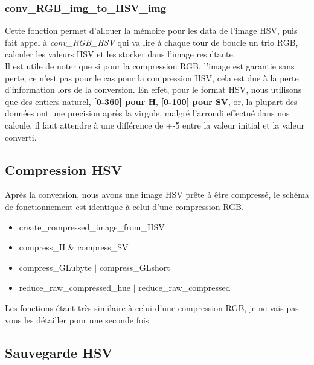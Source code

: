 \documentclass[12pt, letterpaper]{article}
\begin{document}
\subsubsection{conv\_RGB\_img\_to\_HSV\_img}
Cette fonction permet d'allouer la mémoire pour les data de l'image HSV, puis fait appel à 
\textit{conv\_RGB\_HSV} qui va lire à chaque tour de boucle un trio RGB, calculer les valeurs HSV et les stocker dans l'image resultante.\\
Il est utile de noter que si pour la compression RGB, l'image est garantie sans perte, ce n'est pas pour le cas pour la compression HSV, 
cela est due à la perte d'information lors de la conversion. 
En effet, pour le format HSV, nous utilisons que des entiers naturel, \textbf{[0-360] pour H}, 
\textbf{[0-100] pour SV}, or, la plupart des données ont une precision après la virgule, malgré l'arrondi effectué dans 
nos calcule, il faut attendre à une différence de +-5 entre la valeur initial et la valeur converti.

\subsection{Compression HSV}
Après la conversion, nous avons une image HSV prête à être compressé, le schéma de fonctionnement est identique à celui d'une compression 
RGB.
\begin{itemize}
    \item create\_compressed\_image\_from\_HSV 
    \item compress\_H \& compress\_SV
    \item compress\_GLubyte $|$  compress\_GLshort
    \item reduce\_raw\_compressed\_hue $|$ reduce\_raw\_compressed
\end{itemize}
Les fonctions étant très similaire à celui d'une compression RGB, je ne vais pas vous les détailler pour une seconde fois.

\subsection{Sauvegarde HSV}
\end{document}
